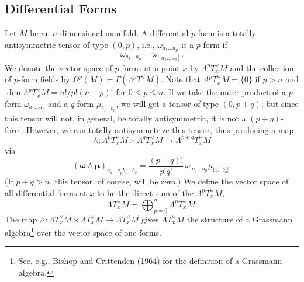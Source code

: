 
\subsection{Differential Forms}\label{sec:B.1}

Let \(M\) be an \(n\)-dimensional manifold. A differential \(p\)-form is a totally
antisymmetric tensor of type \((0,p)\), i.e., \(\omega_{a_1\ldots a_p}\) is a \(p\)-form
if
\begin{equation}
  \omega_{a_1\ldots a_p}=\omega_{[a_1\ldots a_p]}.
  \tag{B.1.1}\label{eq:B.1.1}
\end{equation}
We denote the vector space of \(p\)-forms at a point \(x\) by
\(\Lambda^pT_x^\vee M\) and the collection of \(p\)-form fields by
\(\Omega^p(M)=\Gamma\!\left(\Lambda^pT^\vee M\right)\). Note that
\(\Lambda^pT_x^\vee M=\{0\}\) if \(p>n\) and
\(\dim\Lambda^pT_x^\vee M=n!/p!(n-p)!\) for \(0\leq p\leq n\). If we take the outer
product of a \(p\)-form \(\omega_{a_1\ldots a_p}\) and a \(q\)-form
\(\mu_{b_1\ldots b_q}\), we will get a tensor of type \((0,p+q)\); but since this
tensor will not, in general, be totally antisymmetric, it is not a \((p+q)\)-form.
However, we can totally antisymmetrize this tensor, thus producing a map
\[
  \wedge:\Lambda^pT_x^\vee M\times\Lambda^qT_x^\vee M
  \longrightarrow\Lambda^{p+q}T_x^\vee M
\]
via
\begin{equation}
  (\boldsymbol\omega\wedge\boldsymbol\mu)_{a_1\ldots a_pb_1\ldots b_q}
  =\frac{(p+q)!}{p!q!}\,
  \omega_{[a_1\ldots a_p}\mu_{b_1\ldots b_q]}.
  \tag{B.1.2}\label{eq:B.1.2}
\end{equation}
(If \(p+q>n\), this tensor, of course, will be zero.) We define the vector space of
all differential forms at \(x\) to be the direct sum of the
\(\Lambda^pT_x^\vee M\),
\begin{equation}
  \Lambda T_x^\vee M=\bigoplus_{p=0}^{n}\Lambda^pT_x^\vee M.
  \tag{B.1.3}\label{eq:B.1.3}
\end{equation}
The map
\(\wedge:\Lambda T_x^\vee M\times\Lambda T_x^\vee M\longrightarrow\Lambda T_x^\vee M\)
gives \(\Lambda T_x^\vee M\) the structure of a Grassmann algebra\footnote{See, e.g.,
Bishop and Crittenden (1964) for the definition of a Grassmann algebra.} over the
vector space of one-forms.

